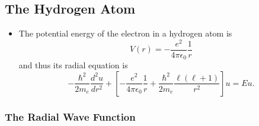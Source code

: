 \documentclass{article}
\begin{document}
\subsection{The Hydrogen Atom}

\begin{itemize}
  \item The potential energy of the electron in a hydrogen atom is \[V(r) = -\frac{e^2}{4 \pi \epsilon_0} \frac{1}{r}\] and thus its radial equation is \[-\frac{\hbar^2}{2 m_e} \frac{d^2 u}{d r^2} + \left[ -\frac{e^2}{4 \pi \epsilon_0} \frac{1}{r} + \frac{\hbar^2}{2 m_e} \frac{\ell (\ell + 1)}{r^2} \right] u = E u.\]
\end{itemize}

\subsubsection{The Radial Wave Function}
\end{document}
